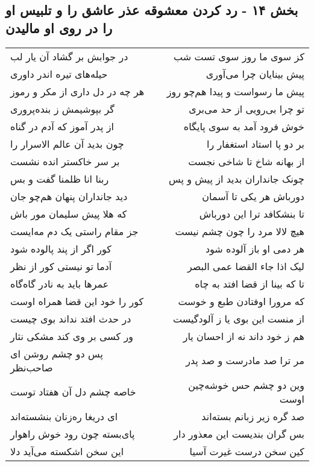 \begin{center}
\section*{بخش ۱۴ - رد کردن معشوقه عذر عاشق را و تلبیس او را در روی او مالیدن}
\label{sec:sh014}
\begin{longtable}{l p{0.5cm} r}
در جوابش بر گشاد آن یار لب
&&
کز سوی ما روز سوی تست شب
\\
حیله‌های تیره اندر داوری
&&
پیش بینایان چرا می‌آوری
\\
هر چه در دل داری از مکر و رموز
&&
پیش ما رسواست و پیدا هم‌چو روز
\\
گر بپوشیمش ز بنده‌پروری
&&
تو چرا بی‌رویی از حد می‌بری
\\
از پدر آموز که آدم در گناه
&&
خوش فرود آمد به سوی پایگاه
\\
چون بدید آن عالم الاسرار را
&&
بر دو پا استاد استغفار را
\\
بر سر خاکستر انده نشست
&&
از بهانه شاخ تا شاخی نجست
\\
ربنا انا ظلمنا گفت و بس
&&
چونک جانداران بدید از پیش و پس
\\
دید جانداران پنهان هم‌چو جان
&&
دورباش هر یکی تا آسمان
\\
که هلا پیش سلیمان مور باش
&&
تا بنشکافد ترا این دورباش
\\
جز مقام راستی یک دم مه‌ایست
&&
هیچ لالا مرد را چون چشم نیست
\\
کور اگر از پند پالوده شود
&&
هر دمی او باز آلوده شود
\\
آدما تو نیستی کور از نظر
&&
لیک اذا جاء القضا عمی البصر
\\
عمرها باید به نادر گاه‌گاه
&&
تا که بینا از قضا افتد به چاه
\\
کور را خود این قضا همراه اوست
&&
که مرورا اوفتادن طبع و خوست
\\
در حدث افتد نداند بوی چیست
&&
از منست این بوی یا ز آلودگیست
\\
ور کسی بر وی کند مشکی نثار
&&
هم ز خود داند نه از احسان یار
\\
پس دو چشم روشن ای صاحب‌نظر
&&
مر ترا صد مادرست و صد پدر
\\
خاصه چشم دل آن هفتاد توست
&&
وین دو چشم حس خوشه‌چین اوست
\\
ای دریغا ره‌زنان بنشسته‌اند
&&
صد گره زیر زبانم بسته‌اند
\\
پای‌بسته چون رود خوش راهوار
&&
بس گران بندیست این معذور دار
\\
این سخن اشکسته می‌آید دلا
&&
کین سخن درست غیرت آسیا
\\

\end{longtable}
\end{center}
